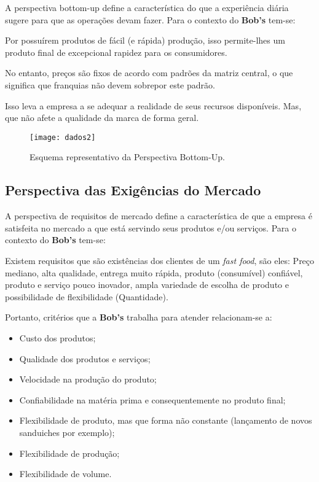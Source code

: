 			A perspectiva bottom-up define a característica do que a experiência diária sugere para que as operações devam fazer. Para o contexto do \textbf{Bob’s} tem-se:

			Por possuírem produtos de fácil (e rápida) produção, isso permite-lhes um produto final de excepcional rapidez para os consumidores. 

			No entanto, preços são fixos de acordo com padrões da matriz central, o que significa que franquias não devem sobrepor este padrão.

			Isso leva a empresa a se adequar a realidade de seus recursos disponíveis. Mas, que não afete a qualidade da marca de forma geral.

			\begin{figure}[h]
				\centering
				\texttt{[image: dados2]}
				\caption[Esquema representativo da Perspectiva Bottom-Up]{Esquema representativo da Perspectiva Bottom-Up. \cite{slack}}
				\label{fig:dados2}
			\end{figure}

		\subsection[Perspectiva das Exigências do Mercado]{Perspectiva das Exigências do Mercado}
		\label{sec:dados_perspLeste}
			
			A perspectiva de requisitos de mercado define a característica de que a empresa é satisfeita no mercado a que está servindo seus produtos e/ou serviços. Para o contexto do \textbf{Bob’s} tem-se:

			Existem requisitos que são existências dos clientes de um \emph{fast food}, são eles: Preço mediano, alta qualidade, entrega muito rápida, produto (consumível) confiável, produto e serviço pouco inovador, ampla variedade de escolha de produto e possibilidade de flexibilidade (Quantidade).

			Portanto, critérios que a \textbf{Bob’s} trabalha para atender relacionam-se a:

			\begin{itemize}
				\item{Custo dos produtos;}
				\item{Qualidade dos produtos e serviços;}
				\item{Velocidade na produção do produto;}
				\item{Confiabilidade na matéria prima e consequentemente no produto final;}
				\item{Flexibilidade de produto, mas que forma não constante (lançamento de novos sanduiches por exemplo);}
				\item{Flexibilidade de produção;}
				\item{Flexibilidade de volume.}
			\end{itemize}


